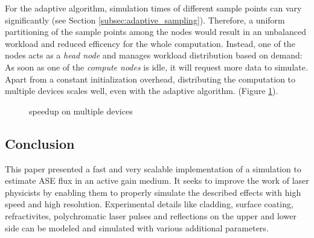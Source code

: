 For the adaptive algorithm, simulation times of different sample points can vary
significantly (see Section \ref{subsec:adaptive_sampling}). Therefore, a uniform
partitioning of the sample points among the nodes would result in an unbalanced
workload and reduced efficency for the whole computation. Instead, one of the
nodes acts as a \emph{head node} and manages workload distribution based on demand: As
soon as one of the \emph{compute nodes} is idle, it will request more data to simulate.
Apart from a constant initialization overhead, distributing the computation to
multiple devices scales well, even with the adaptive algorithm. (Figure
\ref{plot:gpu_scaling}).
\begin{figure}[H]
  \centerline{
    }
  \caption{speedup on multiple devices}
  \label{plot:gpu_scaling}
\end{figure}

\subsection{Conclusion}
\label{subsec:conclusion}
This paper presented a fast and very scalable implementation of a simulation to
estimate ASE flux in an active gain medium. It seeks to improve the work of
laser physicists by enabling them to properly simulate the described effects
with high speed and high resolution. Experimental details like cladding, surface
coating, refractivites, polychromatic laser pulses and reflections on the upper
and lower side can be modeled and simulated with various additional parameters.

